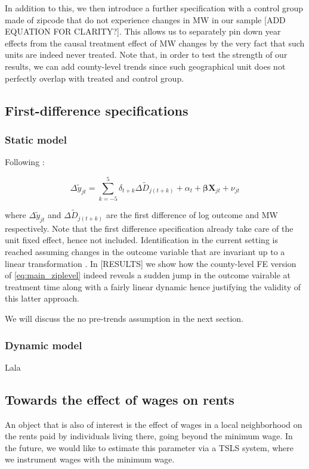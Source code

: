     In addition to this, we then introduce a further specification with a control group made of zipcode that do not experience changes in MW in our sample [ADD EQUATION FOR CLARITY?]. This allows us to separately pin down year effects from the causal treatment effect of MW changes by the very fact that such units are indeed never treated. Note that, in order to test the strength of our results, we can add county-level trends since such geographical unit does not perfectly overlap with treated and control group. \\   

\subsection{First-difference specifications}\label{subsec:empirical_strategy/first-difference}

\subsubsection{Static model}

    Following \textcite{meer2016effects} : 
    
    \begin{equation}\label{eq:diff_main}
        \Delta \tilde{y}_{jt} = \sum\limits_{k = -5}^{5} \delta_{t+k} \Delta \tilde{D}_{j(t+k)} + \alpha_{t} + \boldsymbol{\beta} \boldsymbol{X}_{jt} + \nu_{jt}
    \end{equation}
    
    where $\Delta \tilde{y}_{jt}$ and $\Delta \tilde{D}_{j(t+k)}$ are the first difference of log outcome and MW respectively. Note that the first difference specification already take care of the unit fixed effect, hence not included. Identification in the current setting is reached assuming changes in the outcome variable that are invariant up to a linear transformation \parencite{borusyak2017revisiting}. In [RESULTS] we show how the county-level FE version of \autoref{eq:main_ziplevel} indeed reveals a sudden jump in the outcome vairable at treatment time along with a fairly linear dynamic hence justifying the validity of this latter approach. 
    
    We will discuss the no pre-trends assumption in the next section.


\subsubsection{Dynamic model}

    Lala
    

\subsection{Towards the effect of wages on rents}

    An object that is also of interest is the effect of wages in a local neighborhood on the rents paid by individuals living there, going beyond the minimum wage. In the future, we would like to estimate this parameter via a TSLS system, where we instrument wages with the minimum wage.
